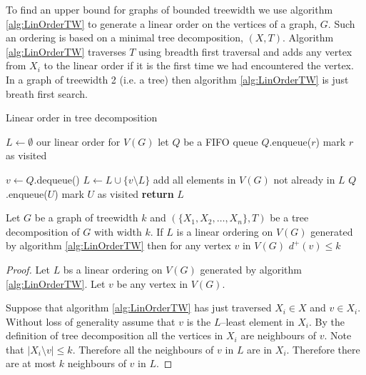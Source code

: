 To find an upper bound for graphs of bounded treewidth we use algorithm \ref{alg:LinOrderTW} to generate a linear order on the vertices of a graph, $G$. Such an ordering is based on a minimal tree decomposition, $(X,T)$. Algorithm \ref{alg:LinOrderTW} traverses $T$ using breadth first traversal and adds any vertex from $X_i$ to the linear order if it is the first time we  had encountered the vertex. In a graph of treewidth 2 (i.e. a tree) then algorithm \ref{alg:LinOrderTW} is just breath first search.

\begin{algorithm}[h]
    \caption{Linear order in tree decomposition}
    \label{alg:LinOrderTW}
    \begin{algorithmic}[1]
        
            \State $L \gets \emptyset$ \Comment our linear order for $V(G)$
            \State let $Q$ be a FIFO queue 
            \State $Q$.enqueue($r$)
            \State mark $r$ as visited
            
                \State $v \gets Q$.dequeue()
                \State $L \gets L \cup \{v\setminus L\}$ \Comment add all elements in $V(G)$ not already in $L$
                    \State $Q$.enqueue($U$)
                    \State mark $U$ as visited
                \EndFor        
            \EndWhile 
            \State \textbf{return}  $L$
        \EndFunction
    \end{algorithmic}
\end{algorithm}

\begin{lemma}[Askes] \label{Lemma_TWLinOrdBound}
    Let $G$ be a graph of treewidth $k$ and $(\{X_1,X_2,\dots,X_n\},T)$ be a tree decomposition of $G$ with width $k$.
    If $L$ is a linear ordering on $V(G)$ generated by algorithm \ref{alg:LinOrderTW} then for any vertex $v$ in $V(G)$ 
    $d^+(v) \leq k$
\end{lemma}

\begin{proof}    
    Let $L$ bs a linear ordering on $V(G)$ generated by algorithm \ref{alg:LinOrderTW}. Let $v$ be any vertex in $V(G)$. %
    
    Suppose that algorithm \ref{alg:LinOrderTW} has just traversed $X_i\in X$ and $v\in X_i$. Without loss of generality assume that $v$ is the $L$--least element in $X_i$. By the definition of tree decomposition all the vertices in $X_i$ are neighbours of $v$. Note that $|X_i\setminus v|\leq k$. Therefore all the neighbours of $v$ in $L$ are in $X_i$. Therefore there are at most $k$ neighbours of $v$ in $L$.   
\end{proof}


